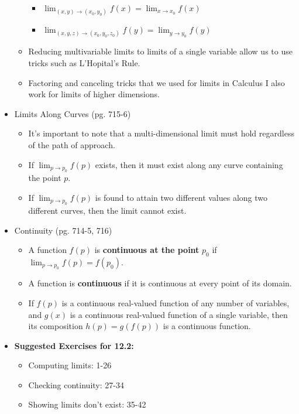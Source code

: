 \documentclass[12pt]{article}
\theoremstyle{plain}
\theoremstyle{definition}
\theoremstyle{remark}
\newcommand{\ds}{\displaystyle}
\begin{document}
\begin{itemize}
\begin{itemize}
			\begin{itemize}
			\item $\ds \lim_{(x,y)\to(x_0,y_0)} f(x) = \lim_{x\to x_0} f(x)$
			\item $\ds \lim_{(x,y,z)\to(x_0,y_0,z_0)} f(y) = \lim_{y\to y_0} f(y)$
			\end{itemize}
		
		\item Reducing multivariable limits to limits of a single variable allow us to use tricks such as L'Hopital's Rule. 
			
		\item Factoring and canceling tricks that we used for limits in Calculus I also work for limits of higher dimensions.
			
		\end{itemize}
	
	\item Limits Along Curves (pg. 715-6)
	
		\begin{itemize}
		\item It's important to note that a multi-dimensional limit must hold regardless of the path of approach.
		\item If $\ds\lim_{p\to p_0} f(p)$ exists, then it must exist along any curve containing the point $p$.
		\item If $\ds\lim_{p\to p_0} f(p)$ is found to attain two different values along two different curves, then the limit cannot exist.
		\end{itemize}
	
	\item Continuity (pg. 714-5, 716)
	
		\begin{itemize}
		\item A function $f(p)$ is \textbf{continuous at the point} $p_0$ if $\ds \lim_{p\to p_0}f(p) = f(p_0)$. 
		\item A function is \textbf{continuous} if it is continuous at every point of its domain.
		\item If $f(p)$ is a continuous real-valued function of any number of variables, and $g(x)$ is a continuous real-valued function of a single variable, then its composition $h(p) = g(f(p))$ is a continuous function.
		\end{itemize}
	
	\item \textbf{ Suggested Exercises for 12.2:}
	
		\begin{itemize}
		\item Computing limits: 1-26
		\item Checking continuity: 27-34
		\item Showing limits don't exist: 35-42
		\end{itemize}
	
	\end{itemize}
	
\end{document}
